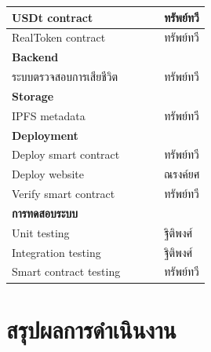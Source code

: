 \documentclass[12pt,oneside,openright,a4paper]{cpe-thai-project}
\begin{document}
\begin{table}[h]
{\begin{tabular}{|lllll|}
\multicolumn{1}{|l|}{USDt contract} &
  \multicolumn{1}{l|}{\cellcolor[HTML]{25AE7A}} &
  \multicolumn{1}{l|}{} &
  \multicolumn{1}{l|}{} &
  ทรัพย์ทวี \\ \hline
\multicolumn{1}{|l|}{RealToken contract} &
  \multicolumn{1}{l|}{\cellcolor[HTML]{25AE7A}} &
  \multicolumn{1}{l|}{} &
  \multicolumn{1}{l|}{} &
  ทรัพย์ทวี \\ \hline
\multicolumn{5}{|l|}{\textbf{Backend}} \\ \hline
\multicolumn{1}{|l|}{ระบบตรวจสอบการเสียชีวิต} &
  \multicolumn{1}{l|}{} &
  \multicolumn{1}{l|}{} &
  \multicolumn{1}{l|}{\cellcolor[HTML]{C0C0C0}} &
  ทรัพย์ทวี \\ \hline
\multicolumn{5}{|l|}{\textbf{Storage}} \\ \hline
\multicolumn{1}{|l|}{IPFS metadata} &
  \multicolumn{1}{l|}{\cellcolor[HTML]{25AE7A}} &
  \multicolumn{1}{l|}{} &
  \multicolumn{1}{l|}{} &
  ทรัพย์ทวี \\ \hline
\multicolumn{5}{|l|}{\textbf{Deployment}} \\ \hline
\multicolumn{1}{|l|}{Deploy smart contract} &
  \multicolumn{1}{l|}{\cellcolor[HTML]{25AE7A}} &
  \multicolumn{1}{l|}{} &
  \multicolumn{1}{l|}{} &
  ทรัพย์ทวี \\ \hline
\multicolumn{1}{|l|}{Deploy website} &
  \multicolumn{1}{l|}{\cellcolor[HTML]{25AE7A}} &
  \multicolumn{1}{l|}{} &
  \multicolumn{1}{l|}{} &
  ณรงค์ยศ \\ \hline
\multicolumn{1}{|l|}{Verify smart contract} &
  \multicolumn{1}{l|}{\cellcolor[HTML]{25AE7A}} &
  \multicolumn{1}{l|}{} &
  \multicolumn{1}{l|}{} &
  ทรัพย์ทวี \\ \hline
\multicolumn{5}{|l|}{\textbf{การทดสอบระบบ}} \\ \hline
\multicolumn{1}{|l|}{Unit testing} &
  \multicolumn{1}{l|}{\cellcolor[HTML]{25AE7A}} &
  \multicolumn{1}{l|}{} &
  \multicolumn{1}{l|}{} &
  ฐิติพงศ์ \\ \hline
\multicolumn{1}{|l|}{Integration testing} &
  \multicolumn{1}{l|}{\cellcolor[HTML]{25AE7A}} &
  \multicolumn{1}{l|}{} &
  \multicolumn{1}{l|}{} &
  ฐิติพงศ์ \\ \hline
\multicolumn{1}{|l|}{Smart contract testing} &
  \multicolumn{1}{l|}{\cellcolor[HTML]{25AE7A}} &
  \multicolumn{1}{l|}{} &
  \multicolumn{1}{l|}{} &
  ทรัพย์ทวี \\ \hline
\end{tabular}%
}
\end{table}
\clearpage

\section{สรุปผลการดำเนินงาน}
\end{document}
